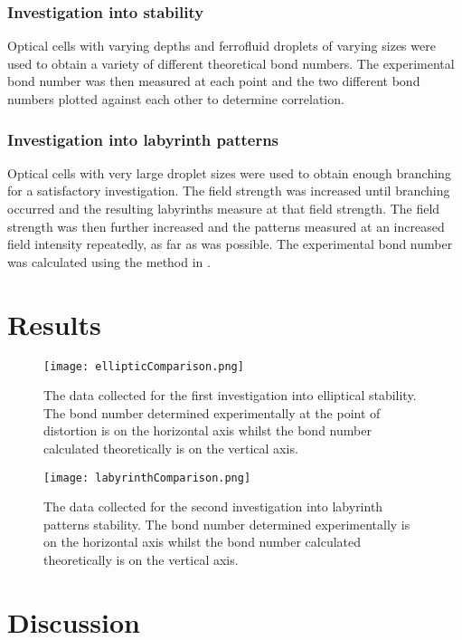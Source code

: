 \documentclass[12pt]{article}
\begin{document}
\subsubsection{Investigation into stability}
Optical cells with varying depths and ferrofluid droplets of varying sizes were used to obtain a variety of different theoretical bond numbers. The experimental bond number was then measured at each point and the two different bond numbers plotted against each other to determine correlation.\cite{ref4}

\subsubsection{Investigation into labyrinth patterns}
Optical cells with very large droplet sizes were used to obtain enough branching for a satisfactory investigation. The field strength was increased until branching occurred and the resulting labyrinths measure at that field strength. The field strength was then further increased and the patterns measured at an increased field intensity repeatedly, as far as was possible. The experimental bond number was calculated using the method in \cite{ref3}.

\section{Results}
\begin{figure}[H]
\centering
\texttt{[image: ellipticComparison.png]}
\caption{The data collected for the first investigation into elliptical stability. The bond number determined experimentally at the point of distortion is on the horizontal axis whilst the bond number calculated theoretically \cite{ref4} is on the vertical axis.}
\label{ellipticComparison}
\end{figure}
\begin{figure}[H]
\centering
\texttt{[image: labyrinthComparison.png]}
\caption{The data collected for the second investigation into labyrinth patterns stability. The bond number determined experimentally is on the horizontal axis whilst the bond number calculated theoretically \cite{ref3} is on the vertical axis.}
\label{labyrinthComparison}
\end{figure}

\section{Discussion}
\end{document}
